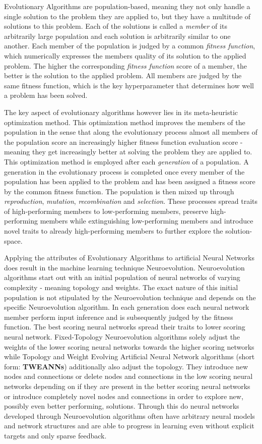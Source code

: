 \documentclass[journal, a4paper]{IEEEtran}
\begin{document}
Evolutionary Algorithms are population-based, meaning they not only handle a single solution to the problem they are applied to, but they have a multitude of solutions to this problem. Each of the solutions is called a \textit{member} of its arbitrarily large population and each solution is arbitrarily similar to one another. Each member of the population is judged by a common \textit{fitness function}, which numerically expresses the members quality of its solution to the applied problem. The higher the corresponding \textit{fitness function} score of a member, the better is the solution to the applied problem. All members are judged by the same fitness function, which is the key hyperparameter that determines how well a problem has been solved.

The key aspect of evolutionary algorithms however lies in its meta-heuristic optimization method. This optimization method improves the members of the population in the sense that along the evolutionary process almost all members of the population score an increasingly higher fitness function evaluation score - meaning they get increasingly better at solving the problem they are applied to.
This optimization method is employed after each \textit{generation} of a population. A generation in the evolutionary process is completed once every member of the population has been applied to the problem and has been assigned a fitness score by the common fitness function. The population is then mixed up through \textit{reproduction}, \textit{mutation}, \textit{recombination} and \textit{selection}. These processes spread traits of high-performing members to low-performing members, preserve high-performing members while extinguishing low-performing members and introduce novel traits to already high-performing members to further explore the solution-space.

Applying the attributes of Evolutionary Algorithms to artificial Neural Networks does result in the machine learning technique Neuroevolution. Neuroevolution algorithms start out with an initial population of neural networks of varying complexity - meaning topology and weights. The exact nature of this initial population is not stipulated by the Neuroevolution technique and depends on the specific Neuroevolution algorithm. In each generation does each neural network member perform input inference and is subsequently judged by the fitness function. The best scoring neural networks spread their traits to lower scoring neural network. Fixed-Topology Neuroevolution algorithms solely adjust the weights of the lower scoring neural networks towards the higher scoring networks while Topology and Weight Evolving Artificial Neural Network algorithms (short form: \textbf{TWEANNs}) additionally also adjust the topology. They introduce new nodes and connections or delete nodes and connections in the low scoring neural networks depending on if they are present in the better scoring neural networks or introduce completely novel nodes and connections in order to explore new, possibly even better performing, solutions.
Through this do neural networks developed through Neuroevolution algorithms often have arbitrary neural models and network structures and are able to progress in learning even without explicit targets and only sparse feedback.
\end{document}
